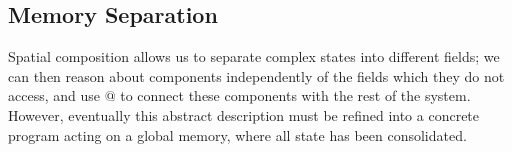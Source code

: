 \documentclass[acmsmall,screen,review,anonymous]{acmart}
\begin{document}
%

\subsection{Memory Separation} \label{sec:overview:sepalg} %

Spatial composition
allows us to separate
complex states into different fields;
we can then reason about components
independently of the fields which they do not access,
and use $\mathbin@$
to connect these components with the rest of the system.
However, eventually this abstract description
must be refined into a concrete program
acting on a global memory,
where all state has been consolidated.
\end{document}
